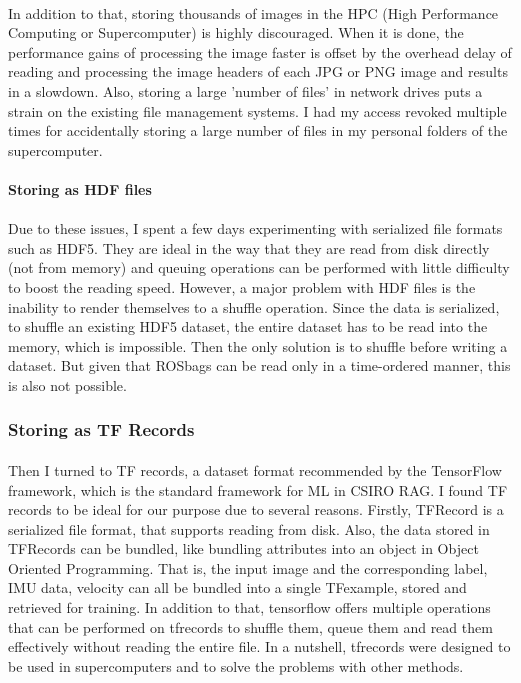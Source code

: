 \paragraph{}
In addition to that, storing thousands of images in the HPC (High Performance Computing or Supercomputer) is highly discouraged. When it is done, the performance gains of processing the image faster is offset by the overhead delay of reading and processing the image headers of each JPG or PNG image and results in a slowdown. Also, storing a large 'number of files' in network drives puts a strain on the existing file management systems. I had my access revoked multiple times for accidentally storing a large number of files in my personal folders of the supercomputer.

\paragraph{}
\textbf{Storing as HDF files}

\paragraph{}
Due to these issues, I spent a few days experimenting with serialized file formats such as HDF5. They are ideal in the way that they are read from disk directly (not from memory) and queuing operations can be performed with little difficulty to boost the reading speed. However, a major problem with HDF files is the inability to render themselves to a shuffle operation. Since the data is serialized, to shuffle an existing HDF5 dataset, the entire dataset has to be read into the memory, which is impossible. Then the only solution is to shuffle before writing a dataset. But given that ROSbags can be read only in a time-ordered manner, this is also not possible.

\subsubsection{Storing as TF Records}

\paragraph{}
Then I turned to TF records, a dataset format recommended by the TensorFlow framework, which is the standard framework for ML in CSIRO RAG. I found TF records to be ideal for our purpose due to several reasons. Firstly, TFRecord is a serialized file format, that supports reading from disk. Also, the data stored in TFRecords can be bundled, like bundling attributes into an object in Object Oriented Programming. That is, the input image and the corresponding label, IMU data, velocity can all be bundled into a single TFexample, stored and retrieved for training. In addition to that, tensorflow offers multiple operations that can be performed on tfrecords to shuffle them, queue them and read them effectively without reading the entire file. In a nutshell, tfrecords were designed to be used in supercomputers and to solve the problems with other methods.


